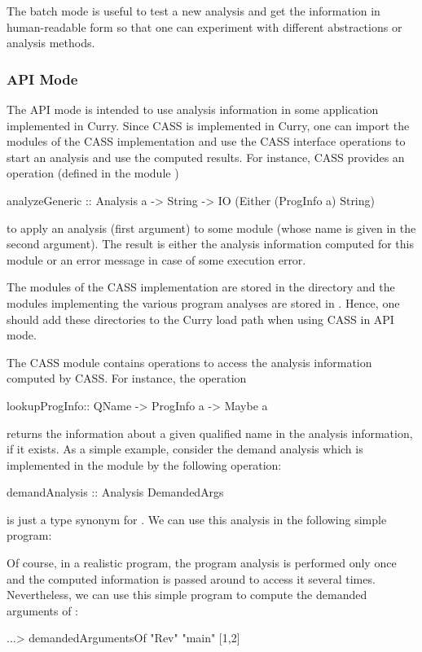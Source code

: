 The batch mode is useful to test a new analysis and get the information
in human-readable form so that one can experiment
with different abstractions or analysis methods.

\subsubsection{API Mode}

The API mode is intended to use analysis information in some
application implemented in Curry. Since CASS is implemented in Curry,
one can import the modules of the CASS implementation and
use the CASS interface operations to start an analysis and use the
computed results. For instance, CASS provides an operation
(defined in the module )
\begin{curry}
analyzeGeneric :: Analysis a -> String -> IO (Either (ProgInfo a) String)
\end{curry}
to apply an analysis (first argument) to some module (whose name is
given in the second argument). The result is either the analysis
information computed for this module or an error message in case of
some execution error.

The modules of the CASS implementation are stored in the directory
 and the modules implementing
the various program analyses are stored in
.
Hence, one should add these directories to the Curry load path
when using CASS in API mode.

The CASS module  contains operations
to access the analysis information computed by CASS.
For instance, the operation
\begin{curry}
lookupProgInfo:: QName -> ProgInfo a -> Maybe a
\end{curry}
returns the information about a given qualified name in the
analysis information, if it exists.
As a simple example, consider the demand analysis which is implemented
in the module  by the following operation:
\begin{curry}
demandAnalysis :: Analysis DemandedArgs
\end{curry}
 is just a type synonym for \code{[Int]}.
We can use this analysis in the following simple program:
Of course, in a realistic program, the program analysis
is performed only once and the computed information 
is passed around to access it several times.
Nevertheless, we can use this simple program to compute the
demanded arguments of :
\begin{curry}
$\ldots$> demandedArgumentsOf "Rev" "main"
[1,2]
\end{curry}


